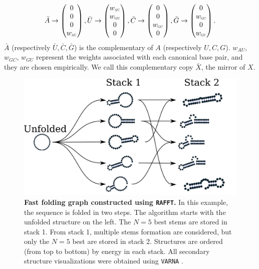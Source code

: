 \begin{equation}
\begin{split}
\bar{A} \rightarrow \begin{pmatrix} 0\\ 0\\ 0\\ w_{\scalebox{0.5}{AU}}\\ \end{pmatrix},
\bar{U} \rightarrow \begin{pmatrix} w_{\scalebox{0.5}{AU}}\\ w_{\scalebox{0.5}{GU}}\\ 0\\ 0\\ \end{pmatrix},
\bar{C} \rightarrow \begin{pmatrix} 0\\ 0\\ w_{\scalebox{0.5}{GC}}\\ 0\\ \end{pmatrix},
\bar{G} \rightarrow \begin{pmatrix} 0\\ w_{\scalebox{0.5}{GC}}\\ 0\\ w_{\scalebox{0.5}{GU}}\\ \end{pmatrix}.
\end{split}
\end{equation}
\(\bar{A}\) (respectively \(\bar{U}, \bar{C}, \bar{G}\)) is the complementary of \(A\) (respectively \(U, C, G\)). \(w_{AU}\), \(w_{GC}\), \(w_{GU}\) represent the weights associated with each canonical base pair, and they are chosen empirically. We call this complementary copy \(\bar{X}\), the mirror of \(X\).

\begin{figure}[t!]
	\centering
	\includegraphics[width=1\linewidth]{../res/images/rafft/fast_paths_graph.png}
	\caption{\label{fast_path_graph}\textbf{Fast folding graph constructed using \texttt{RAFFT}.} In this example, the sequence is folded in two steps. The algorithm starts with the unfolded structure on the left. The \(N=5\) best stems are stored in stack 1. From stack 1, multiple stems formation are considered, but only the \(N=5\) best are stored in stack 2. Structures are ordered (from top to bottom) by energy in each stack. All secondary structure visualizations were obtained using \texttt{VARNA} \cite{darty09_varna}.}
\end{figure}


